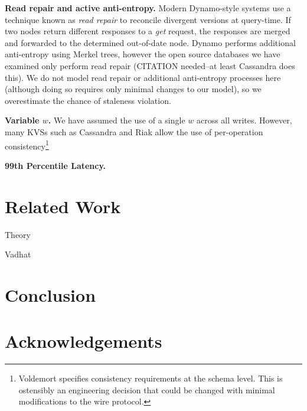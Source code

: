 \documentclass{vldb}
\begin{document}
\textbf{Read repair and active anti-entropy.} Modern Dynamo-style
systems use a technique known as \textit{read repair} to reconcile
divergent versions at query-time.  If two nodes return different
responses to a \textit{get} request, the responses are merged and
forwarded to the determined out-of-date node.  Dynamo performs
additional anti-entropy using Merkel trees, however the open source
databases we have examined only perform read repair (CITATION
needed--at least Cassandra does this). We do not model read repair or
additional anti-entropy processes here (although doing so requires
only minimal changes to our model), so we overestimate the chance of
staleness violation.

\textbf{Variable $w$.} We have assumed the use of a single $w$ across
all writes.  However, many KVSs such as Cassandra and Riak allow the
use of per-operation consistency\footnote{Voldemort specifies
  consistency requirements at the schema level. This is ostensibly an
  engineering decision that could be changed with minimal
  modifications to the wire protocol.}

\textbf{99th Percentile Latency.}


\section{Related Work}

Theory

Vadhat

\section{Conclusion}

\section*{Acknowledgements}

\balance



\end{document}
